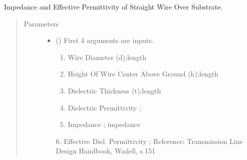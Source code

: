 \documentclass[letterpaper,10pt,english]{sphinxmanual}
\begin{document}

\begin{fulllineitems}
\label{\detokenize{components:components.Z_WG_TE10}}
\end{fulllineitems}


\begin{fulllineitems}
\label{\detokenize{components:components.Zo_eeff_StraightWireOverSubstrate}}
Impedance and Effective Permittivity of Straight Wire Over Substrate.
\begin{quote}\begin{description}
\item[{Parameters}] \leavevmode\begin{itemize}
\item {} 
 () \textendash{} 
First 4 arguments are inputs.
\begin{enumerate}
%
\item {} 
Wire Diameter (d);length

\item {} 
Height Of Wire Center Above Ground (h);length

\item {} 
Dielectric Thickness (t);length

\item {} 
Dielectric Permittivity ;

\item {} 
Impedance ; impedance

\end{enumerate}

6.  Effective Diel. Permittivity ;
Reference:  Transmission Line Design Handbook, Wadell, s.151



\end{itemize}
\end{description}
\end{quote}
\end{fulllineitems}
\end{document}
